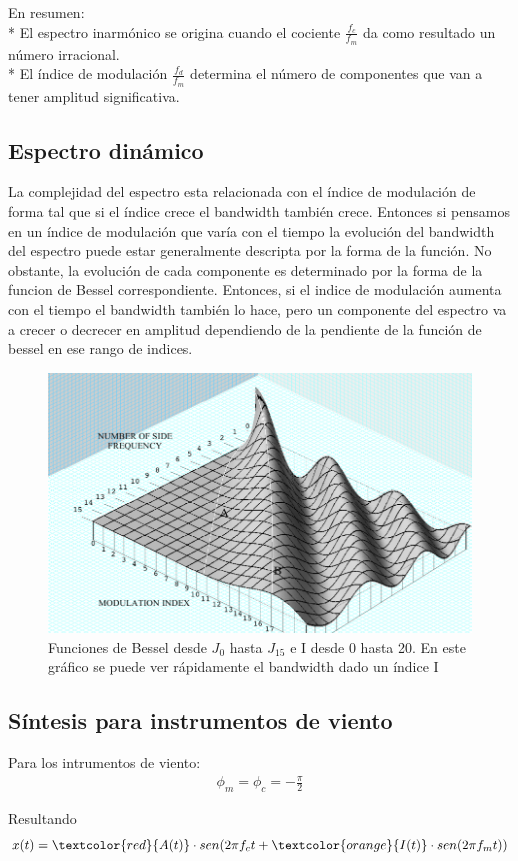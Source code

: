 \documentclass[assd_tp2_main.tex]{subfiles}
\begin{document}
{%
En resumen:\\*
El espectro inarmónico se origina cuando el cociente $\displaystyle \frac{f_c}{f_m}$ da como resultado un número irracional. \\*
El índice de modulación $\displaystyle \frac{f_d}{f_m}$ determina el número de componentes que van a tener amplitud significativa.

\newpage

\subsection{Espectro dinámico}
La complejidad del espectro esta relacionada con el índice de modulación de forma tal que si el índice crece el bandwidth también crece. Entonces si pensamos en un índice de modulación que varía con el tiempo la evolución del bandwidth del espectro puede estar generalmente descripta por la forma de la función.
No obstante, la evolución de cada componente es determinado por la forma de la funcion de Bessel correspondiente.
Entonces, si el indice de modulación aumenta con el tiempo el bandwidth también lo hace, pero un componente del espectro va a crecer o decrecer en amplitud dependiendo de la pendiente de la función de bessel en ese rango de indices.

\begin{figure}[H]
\centering
\includegraphics[width=0.8\linewidth]{graficos/EJ4/EspectroDinamico.png}
\caption{Funciones de Bessel desde $J_0$ hasta $J_{15}$ e I desde 0 hasta 20. En este gráfico se puede ver rápidamente el bandwidth dado un índice I}
\label{fig:DynamicSpectrum}
\end{figure}



\subsection{Síntesis para instrumentos de viento}
Para los intrumentos de viento:
\begin{eqnarray*}
\displaystyle \phi_m=\phi_c=-\frac{\pi}{2}
\end{eqnarray*}
\par
Resultando
\begin{eqnarray*}
\textstyle x(t)=\textcolor{red}{A(t)}\cdot sen(2\pi f_c t+\textcolor{orange}{I(t)}\cdot sen(2\pi f_mt))
\end{eqnarray*}

}
\end{document}
